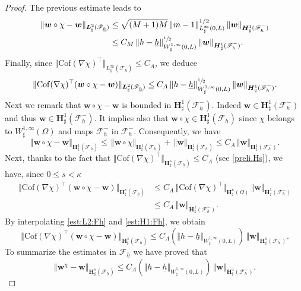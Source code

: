\documentclass[JEP,XML,SOM,Unicode,NoFloatCountersInSection]{cedram}
\let\mathcal\mathscr
\theoremstyle{remark}
\theoremstyle{definition}
\newcommand{\norme}[1]{\,\Vert #1\Vert}
\newcommand{\vnorme}[1]{\Vert #1\Vert}
\newcommand{\wg}{\boldsymbol{w}}
\newcommand{\BS}[1]{\boldsymbol{#1}}
\newcommand{\hb}{{\underline{h}}}
\newcommand{\Cof}{\mathrm{Cof}}
\begin{document}
\begin{proof}
The previous estimate leads to
\[
\begin{aligned}
\norme{\wg\circ\chi-\wg}_{\BS{L}^{2}_{\sharp}(\mathcal{F}_{\hb})}&{}\leq \sqrt{(M+1)M}\norme{m-1}_{L^{\infty}_{\sharp}(0,L)}^{1/2}\norme{\wg}_{\BS{H}^{1}_{\sharp}(\mathcal{F}_{h}^{-})}\nonumber\\
&\leq C_M\norme{h-\hb}_{W^{1,\infty}_{\sharp}(0,L)}^{\sfrac{1}{2}}\norme{\wg}_{\BS{H}^{1}_{\sharp}(\mathcal{F}_{h}^{-})}.
\end{aligned}
\]
Finally, since $\vnorme{\Cof(\nabla\chi)^{\top}}_{L^\infty_\sharp(\mathcal{F}_{\hb})}\leq C_A$, we deduce
\begin{equation}
\label{est:L2:Fh}
\norme{\Cof(\nabla\chi)^{\top}(\wg\circ\chi-\wg)}_{\BS{L}^{2}_{\sharp}(\mathcal{F}_{\hb})}\leq C_A\norme{h-\hb}_{W^{1,\infty}_{\sharp}(0,L)}^{\sfrac{1}{2}}\norme{\wg}_{\BS{H}^{1}_{\sharp}(\mathcal{F}_{h}^{-})}.
\end{equation}
Next we remark that $\wg\circ\chi - \wg$ is bounded in $\BS{H}_{\sharp}^1(\mathcal{F}^{-}_{\hb})$. Indeed $\wg\in \BS{H}_{\sharp}^1(\mathcal{F}^-_{h})$ and thus $\wg\in \BS{H}_{\sharp}^1(\mathcal{F}^{-}_{\hb})$. It implies also that $\wg\circ\chi \in \BS{H}_{\sharp}^1(\mathcal{F}_{\hb})$ since $\chi$ belongs to $W_{\sharp}^{1, \infty}(\Omega)$ and maps $\mathcal{F}^-_{\hb}$ in $\mathcal{F}^-_{h}$. Consequently, we have
\[
\norme{\wg\circ\chi - \wg}_{\BS{H}^{1}_{\sharp}(\mathcal{F}_{\hb})}\leq \norme{\wg\circ\chi}_{\BS{H}^{1}_{\sharp}(\mathcal{F}_{\hb})} + \norme{\wg}_{\BS{H}^{1}_{\sharp}(\mathcal{F}_{\hb})} \leq C_{A}\norme{\wg}_{\BS{H}^{1}_{\sharp}(\mathcal{F}^{-}_{h})}.
\]
Next, thanks to the fact that $\vnorme{\Cof(\nabla\chi)^{\top}}_{\BS{H}^\kappa_\sharp(\mathcal{F}_{\hb})}\leq C_A$ (see \eqref{preli.Hs}), we have, since $0\leq s<\kappa$
\begin{equation}
\begin{aligned}
\norme{\Cof(\nabla\chi)^{\top}(\wg\circ\chi - \wg)}_{\BS{H}^{s}_{\sharp}(\mathcal{F}_{\hb})}& \leq C_{A}{\norme{\Cof(\nabla\chi)^{\top}}_{\BS{H}^{\kappa}_{\sharp}(\Omega)}}\norme{\wg}_{\BS{H}^{1}_{\sharp}(\mathcal{F}^{-}_{h})} \\
& \leq C_{A}\norme{\wg}_{\BS{H}^{1}_{\sharp}(\mathcal{F}^{-}_{h})}.
\end{aligned}\label{est:H1:Fh}
\end{equation}
By interpolating \eqref{est:L2:Fh} and \eqref{est:H1:Fh}, we obtain
\[
\norme{\Cof(\nabla\chi)^{\top}(\wg\circ\chi - \wg)}_{\BS{H}^{s}_{\sharp}(\mathcal{F}_{\hb})}\leq C_A(\vnorme{h-\hb}_{W^{1,\infty}_{\sharp}(0,L)})\norme{\wg}_{\BS{H}^{1}_{\sharp}(\mathcal{F}^{-}_{h})}.
\]
To summarize the estimates in $\mathcal{F}_{\hb}$ we have proved that
\begin{equation} \label{eq.milieu}
\norme{\wg^\chi-\wg}_{\BS{H}^{s}_{\sharp}(\mathcal{F}_{\hb})}\leq C_A(\vnorme{h-\hb}_{W^{1,\infty}_{\sharp}(0,L)})\norme{\wg}_{\BS{H}^{1}_{\sharp}(\mathcal{F}^{-}_{h})}.
\end{equation}


\end{proof}
\end{document}
